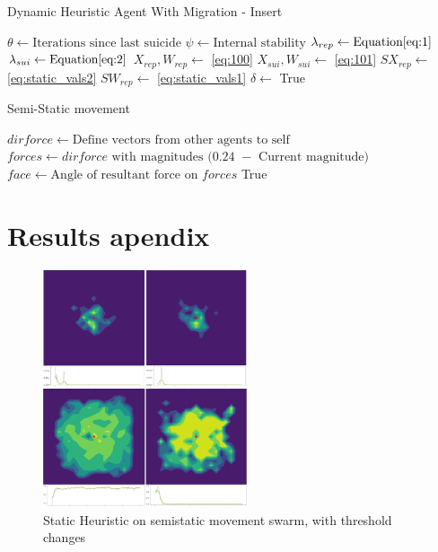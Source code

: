 \documentclass{UoYCSproject}
\begin{document}
\begin{algorithm}
\caption{Dynamic Heuristic Agent With Migration - Insert}
\label{Agent_Control_Loop4}
\begin{algorithmic}[1]
\State $\theta \gets \text{Iterations since last suicide}$
\State $\psi \gets \text{Internal stability}$
\State $\lambda_{rep} \gets \text{Equation} \ref{eq:1}$
\State $\lambda_{sui}  \gets \text{Equation} \ref{eq:2}$
\State $X_{rep}, W_{rep} \gets $ \ref{eq:100}
\State $X_{sui}, W_{sui} \gets $ \ref{eq:101}
\State
\State $SX_{rep} \gets $ \ref{eq:static_vals2}
\State $SW_{rep} \gets $ \ref{eq:static_vals1}
\State
\State $\delta \gets$ 
\State
{}
\State {}
\State
{}
\State {}
\State \Return True
\EndIf
\EndIf
\end{algorithmic}
\end{algorithm}


\begin{algorithm}
\caption{Semi-Static movement}
\label{semistaticmove}
\begin{algorithmic}[1]
\State $dirforce \gets \text{Define vectors from other agents to self}$
\State $forces \gets \text{$dirforce$ with magnitudes $($0.24 $-$ Current magnitude$)$}$
\State
\State {}
\State
\State $face \gets \text{Angle of resultant force on $forces$}$
\State {}
\State
\State \Return True
\EndProcedure
\end{algorithmic}
\end{algorithm}



\chapter{Results apendix}

\begin{figure}[htb]
\label{fig:Threshold_Changes}
\begin{center}
\centering
\includegraphics[height=7cm]{"./Static_Heuristic/Threshold_Changes.png"}
\caption{Static Heuristic on semi\-static movement swarm, with threshold changes}
\end{center}
\end{figure}
\end{document}
